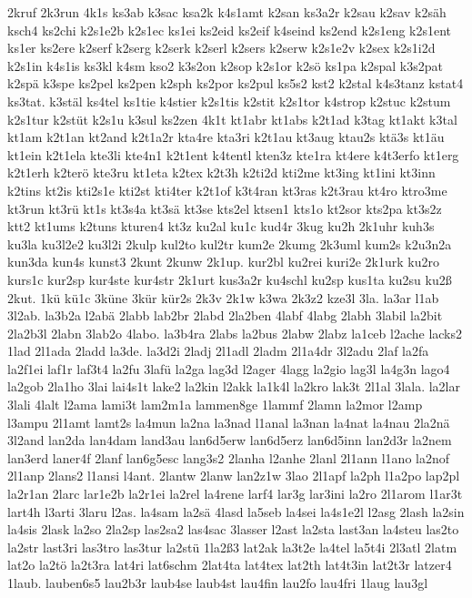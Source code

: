 {2kruf
2k3run
4k1s
ks3ab
k3sac
ksa2k
k4s1amt
k2san
ks3a2r
k2sau
k2sav
k2säh
ksch4
ks2chi
k2s1e2b
k2s1ec
ks1ei
ks2eid
ks2eif
k4seind
ks2end
k2s1eng
k2s1ent
ks1er
ks2ere
k2serf
k2serg
k2serk
k2serl
k2sers
k2serw
k2s1e2v
k2sex
k2s1i2d
k2s1in
k4s1is
ks3kl
k4sm
kso2
k3s2on
k2sop
k2s1or
k2sö
ks1pa
k2spal
k3s2pat
k2spä
k3spe
ks2pel
ks2pen
k2sph
ks2por
ks2pul
ks5s2
kst2
k2stal
k4s3tanz
kstat4
ks3tat.
k3stäl
ks4tel
ks1tie
k4stier
k2s1tis
k2stit
k2s1tor
k4strop
k2stuc
k2stum
k2s1tur
k2stüt
k2s1u
k3sul
ks2zen
4k1t
kt1abr
kt1abs
k2t1ad
k3tag
kt1akt
k3tal
kt1am
k2t1an
kt2and
k2t1a2r
kta4re
kta3ri
k2t1au
kt3aug
ktau2s
ktä3s
kt1äu
kt1ein
k2t1ela
kte3li
kte4n1
k2t1ent
k4tentl
kten3z
kte1ra
kt4ere
k4t3erfo
kt1erg
k2t1erh
k2terö
kte3ru
kt1eta
k2tex
k2t3h
k2ti2d
kti2me
kt3ing
kt1ini
kt3inn
k2tins
kt2is
kti2s1e
kti2st
kti4ter
k2t1of
k3t4ran
kt3ras
k2t3rau
kt4ro
ktro3me
kt3run
kt3rü
kt1s
kt3s4a
kt3sä
kt3se
kts2el
ktsen1
kts1o
kt2sor
kts2pa
kt3s2z
ktt2
kt1ums
k2tuns
kturen4
kt3z
ku2al
ku1c
kud4r
3kug
ku2h
2k1uhr
kuh3s
ku3la
ku3l2e2
ku3l2i
2kulp
kul2to
kul2tr
kum2e
2kumg
2k3uml
kum2s
k2u3n2a
kun3da
kun4s
kunst3
2kunt
2kunw
2k1up.
kur2bl
ku2rei
kuri2e
2k1urk
ku2ro
kurs1c
kur2sp
kur4ste
kur4str
2k1urt
kus3a2r
ku4schl
ku2sp
kus1ta
ku2su
ku2ß
2kut.
1kü
kü1c
3küne
3kür
kür2s
2k3v
2k1w
k3wa
2k3z2
kze3l
3la.
la3ar
l1ab
3l2ab.
la3b2a
l2abä
2labb
lab2br
2labd
2la2ben
4labf
4labg
2labh
3labil
la2bit
2la2b3l
2labn
3lab2o
4labo.
la3b4ra
2labs
la2bus
2labw
2labz
la1ceb
l2ache
lacks2
1lad
2l1ada
2ladd
la3de.
la3d2i
2ladj
2l1adl
2ladm
2l1a4dr
3l2adu
2laf
la2fa
la2f1ei
laf1r
laf3t4
la2fu
3lafü
la2ga
lag3d
l2ager
4lagg
la2gio
lag3l
la4g3n
lago4
la2gob
2la1ho
3lai
lai4s1t
lake2
la2kin
l2akk
la1k4l
la2kro
lak3t
2l1al
3lala.
la2lar
3lali
4lalt
l2ama
lami3t
lam2m1a
lammen8ge
1lammf
2lamn
la2mor
l2amp
l3ampu
2l1amt
lamt2s
la4mun
la2na
la3nad
l1anal
la3nan
la4nat
la4nau
2la2nä
3l2and
lan2da
lan4dam
land3au
lan6d5erw
lan6d5erz
lan6d5inn
lan2d3r
la2nem
lan3erd
laner4f
2lanf
lan6g5esc
lang3s2
2lanha
l2anhe
2lanl
2l1ann
l1ano
la2nof
2l1anp
2lans2
l1ansi
l4ant.
2lantw
2lanw
lan2z1w
3lao
2l1apf
la2ph
l1a2po
lap2pl
la2r1an
2larc
lar1e2b
la2r1ei
la2rel
la4rene
larf4
lar3g
lar3ini
la2ro
2l1arom
l1ar3t
lart4h
l3arti
3laru
l2as.
la4sam
la2sä
4lasd
la5seb
la4sei
la4s1e2l
l2asg
2lash
la2sin
la4sis
2lask
la2so
2la2sp
las2sa2
las4sac
3lasser
l2ast
la2sta
last3an
la4steu
las2to
la2str
last3ri
las3tro
las3tur
la2stü
1la2ß3
lat2ak
la3t2e
la4tel
la5t4i
2l3atl
2latm
lat2o
la2tö
la2t3ra
lat4ri
lat6schm
2lat4ta
lat4tex
lat2th
lat4t3in
lat2t3r
latzer4
1laub.
lauben6s5
lau2b3r
laub4se
laub4st
lau4fin
lau2fo
lau4fri
1laug
lau3gl
}
